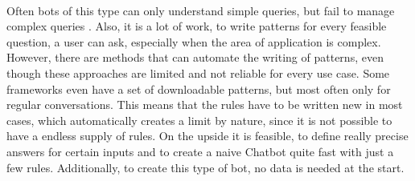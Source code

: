 \documentclass[10pt,final,journal,a4paper,oneside,twocolumn]{IEEEtran}
\begin{document}
\\
Often bots of this type can only understand simple queries, but fail to manage complex queries \cite{b8}. Also, it is a lot of work, to write patterns for every feasible question, a user can ask, especially when the area of application is complex. However, there are methods that can automate the writing of patterns, even though these approaches are limited and not reliable for every use case. Some frameworks even have a set of downloadable patterns, but most often only for regular conversations. This means that the rules have to be written new in most cases, which automatically creates a limit by nature, since it is not possible to have a endless supply of rules. On the upside it is feasible, to define really precise answers for certain inputs and to create a naive Chatbot quite fast with just a few rules. Additionally, to create this type of bot, no data is needed at the start.
\\
\end{document}
